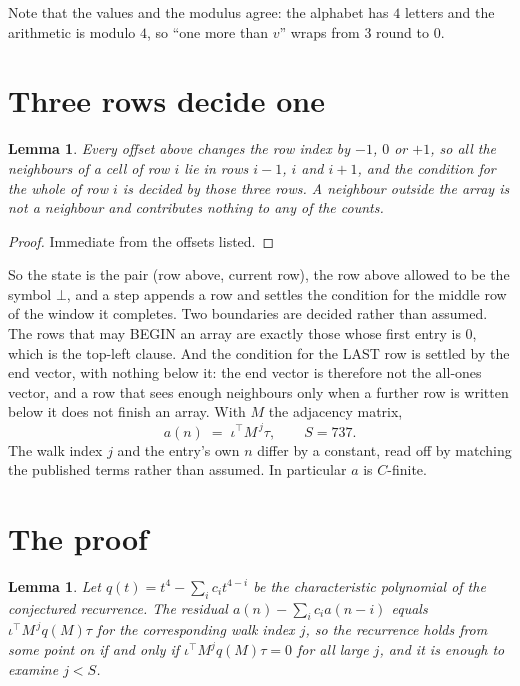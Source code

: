 \documentclass[11pt,a4paper]{article}
\theoremstyle{plain}
\newtheorem{lemma}[theorem]{Lemma}
\theoremstyle{definition}
\begin{document}
Note that the values and the modulus agree: the alphabet has $4$ letters and the arithmetic
is modulo $4$, so ``one more than $v$'' wraps from $3$ round to $0$.

\section{Three rows decide one}

\begin{lemma}\label{lem:win}
Every offset above changes the row index by $-1$, $0$ or $+1$, so all the neighbours of a cell
of row $i$ lie in rows $i-1$, $i$ and $i+1$, and the condition for the whole of row $i$ is
decided by those three rows. A neighbour outside the array is not a neighbour and contributes
nothing to any of the counts.
\end{lemma}

\begin{proof}
Immediate from the offsets listed.
\end{proof}

So the state is the pair (row above, current row), the row above allowed to be the symbol
$\bot$, and a step appends a row and settles the condition for the middle row of the window it
completes. Two boundaries are decided rather than assumed. The rows that may BEGIN an array are
exactly those whose first entry is $0$, which is the top-left clause. And the condition for the
LAST row is settled by the end vector, with nothing below it: the end vector is therefore not
the all-ones vector, and a row that sees enough neighbours only when a further row is written
below it does not finish an array. With $M$ the adjacency matrix,
\[
a(n)\;=\;\iota^{\!\top}M^{\,j}\tau ,\qquad S=737.
\]
The walk index $j$ and the entry's own $n$ differ by a constant, read off by matching the
published terms rather than assumed. In particular $a$ is $C$-finite.

\section{The proof}

\begin{lemma}\label{lem:crit}
Let $q(t)=t^{4}-\sum_i c_it^{4-i}$ be the characteristic polynomial of the
conjectured recurrence. The residual $a(n)-\sum_ic_ia(n-i)$ equals
$\iota^{\!\top}M^{\,j}q(M)\tau$ for the corresponding walk index $j$, so the recurrence
holds from some point on if and only if $\iota^{\!\top}M^{j}q(M)\tau=0$ for all large $j$,
and it is enough to examine $j<S$.
\end{lemma}
\end{document}
